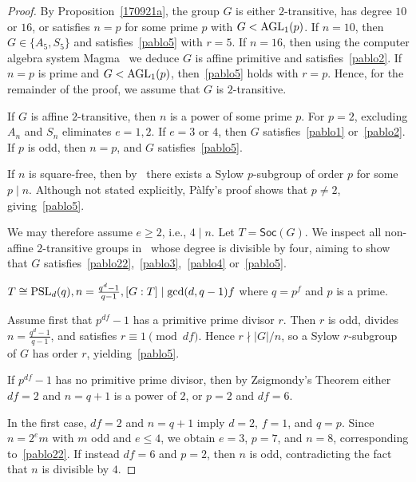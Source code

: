 \documentclass[11pt]{amsart}
\numberwithin{equation}{section}
\theoremstyle{definition}
\newcounter{case}
\newenvironment{case}{\refstepcounter{case}
	\medskip \noindent {\bf Case \textup{\thecase.  }}}{\upshape}
\renewcommand{\thecase}{\arabic{case}}
\def\AGL{{\rm AGL}}
\def\PSL{{\rm PSL}}
\def\soc{{\mathsf{Soc}}}
\begin{document}
	
	\begin{proof}
		By Proposition~\ref{170921a}, the group $G$ is either $2$-transitive, has degree $10$ or $16$, or satisfies $n = p$ for some prime $p$ with $G < \AGL_1(p)$. 
		If $n = 10$, then $G \in \{A_5, S_5\}$ and satisfies~\eqref{pablo5} with $r = 5$. 
		If $n = 16$, then using the computer algebra system Magma~\cite{MAGMA} we deduce $G$ is affine primitive and satisfies~\eqref{pablo2}. 
		If $n = p$ is prime and $G < \AGL_1(p)$, then~\eqref{pablo5} holds with $r = p$. 
		Hence, for the remainder of the proof, we assume that $G$ is $2$-transitive.
		
		If $G$ is affine $2$-transitive, then $n$ is a power of  some prime $p$. 
		For $p = 2$, excluding $A_n$ and $S_n$ eliminates $e = 1,2$. 
		If $e = 3$ or $4$, then $G$ satisfies~\eqref{pablo1} or~\eqref{pablo2}. 
		If $p$ is odd, then $n = p$, and $G$ satisfies~\eqref{pablo5}.
		
		If $n$ is square-free, then by~\cite[Lemma~2.1]{Palfy1987} there exists a Sylow $p$-subgroup of order $p$ for some $p \mid n$. 
		Although not stated explicitly, P\`alfy’s proof shows that $p \ne 2$, giving~\eqref{pablo5}.
		
		We may therefore assume $e \ge 2$, i.e., $4 \mid n$. 
		Let $T = \soc(G)$. 
		We inspect all non-affine $2$-transitive groups in~\cite[Table~7.4]{Cameron1999} whose degree is divisible by four, aiming to show that $G$ satisfies~\eqref{pablo22},~\eqref{pablo3},~\eqref{pablo4} or~\eqref{pablo5}.
		
		\begin{case} $T\cong \PSL_d(q), n = \frac{q^d-1}{q-1}, [G:T]\mid \gcd(d,q-1)f$ where $q=p^f$ and $p$ is a prime.
		\end{case}
		
		Assume first that $p^{df} - 1$ has a primitive prime divisor $r$. 
		Then $r$ is odd, divides $n = \frac{q^{d} - 1}{q - 1}$, and satisfies $r \equiv 1 \pmod{df}$. 
		Hence $r \nmid |G|/n$, so a Sylow $r$-subgroup of $G$ has order $r$, yielding~\eqref{pablo5}. 
		
		If $p^{df} - 1$ has no primitive prime divisor, then by Zsigmondy’s Theorem  either 
		$df = 2$ and $n = q + 1$ is a power of $2$, or $p = 2$ and $df = 6$.  
		
		In the first case, $df = 2$ and $n = q + 1$ imply $d = 2$, $f = 1$, and $q = p$. 
		Since $n = 2^e m$ with $m$ odd and $e \le 4$, we obtain $e = 3$, $p = 7$, and $n = 8$, corresponding to~\eqref{pablo22}.  
		If instead $df = 6$ and $p = 2$, then $n$ is odd, contradicting the fact that $n$ is divisible by $4$.
		

\end{proof}
\end{document}
